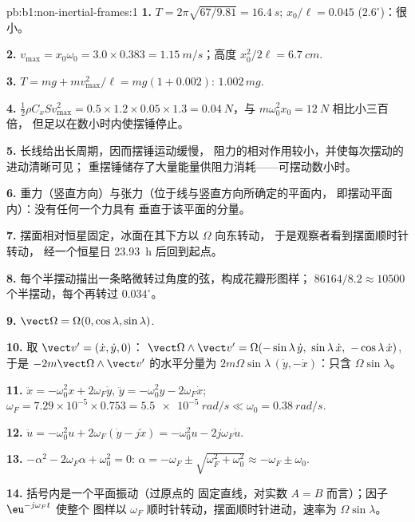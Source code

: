 \begin{solution}{pb:b1:non-inertial-frames:1}
\textbf{1.} $T = 2\pi\sqrt{67/9.81} = \qty{16.4}{s}$; $x_0/\ell = 0.045$
($2.6^\circ$)：很小。

\textbf{2.} $v_{\max} = x_0\omega_0 = 3.0 \times 0.383 = \qty{1.15}{m/s}$；高度
$x_0^2/2\ell = \qty{6.7}{cm}$.

\textbf{3.} $T = mg + mv_{\max}^2/\ell = mg(1 + 0.002)$: $1.002\,mg$.

\textbf{4.} $\tfrac12\rho C_xSv_{\max}^2 = 0.5 \times 1.2 \times 0.05 \times 1.3 =
\qty{0.04}{N}$，与 $m\omega_0^2x_0 = \qty{12}{N}$ 相比小三百倍，
但足以在数小时内使摆锤停止。

\textbf{5.} 长线给出长周期，因而摆锤运动缓慢，
阻力的相对作用较小，并使每次摆动的进动清晰可见；
重摆锤储存了大量能量供阻力消耗——可摆动数小时。

\textbf{6.} 重力（竖直方向）与张力（位于线与竖直方向所确定的平面内，
即摆动平面内）：没有任何一个力具有
垂直于该平面的分量。

\textbf{7.} 摆面相对恒星固定，冰面在其下方以 $\Omega$ 向东转动，
于是观察者看到摆面顺时针转动，
经一个恒星日 \qty{23.93}{h} 后回到起点。

\textbf{8.} 每个半摆动描出一条略微转过角度的弦，构成花瓣形图样；
$86164/8.2 \approx 10500$ 个半摆动，每个再转过 $0.034^\circ$。

\textbf{9.} $\vect\Omega = \Omega(0, \cos\lambda, \sin\lambda)$.

\textbf{10.} 取 $\vect v' = (\dot x, \dot y, 0)$：
$\vect\Omega\wedge\vect v' = \Omega(-\sin\lambda\,\dot y,\ \sin\lambda\,\dot x,\ -\cos\lambda\,\dot x)$,
于是 $-2m\vect\Omega\wedge\vect v'$ 的水平分量为
$2m\Omega\sin\lambda\,(\dot y, -\dot x)$：只含 $\Omega\sin\lambda$。

\textbf{11.} $\ddot x = -\omega_0^2x + 2\omega_F\dot y$, $\ddot y = -\omega_0^2y -
2\omega_F\dot x$; $\omega_F = 7.29\times10^{-5} \times 0.753 = \qty{5.5e-5}{rad/s}
\ll \omega_0 = \qty{0.38}{rad/s}$.

\textbf{12.} $\ddot u = -\omega_0^2u + 2\omega_F(\dot y - j\dot x) = -\omega_0^2u -
2j\omega_F\dot u$.

\textbf{13.} $-\alpha^2 - 2\omega_F\alpha + \omega_0^2 = 0$: $\alpha = -\omega_F \pm
\sqrt{\omega_F^2 + \omega_0^2} \approx -\omega_F \pm \omega_0$.

\textbf{14.} 括号内是一个平面振动（过原点的
固定直线，对实数 $A = B$ 而言）；因子 $\eu^{-j\omega_Ft}$ 使整个
图样以 $\omega_F$ 顺时针转动，摆面顺时针进动，速率为
$\Omega\sin\lambda$。


\end{solution}
